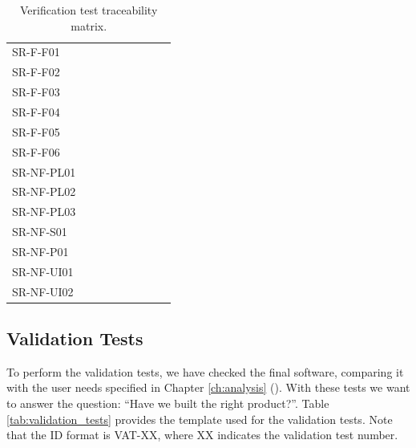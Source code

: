 \begin{table}[htb]
  \centering
  \begin{tabular}{@{}L{3cm}C{0.7cm}C{0.7cm}C{0.7cm}C{0.7cm}C{0.7cm}C{0.7cm}C{0.7cm}C{0.7cm}@{}}
    \toprule
      &  &  &  &  &  &  &  & \\
    \midrule
    SR-F-F01 & & & & & &  & &\\
    SR-F-F02 & & &  & & & & &\\
    SR-F-F03 & & & & & &  & &\\
    SR-F-F04 & & & &  & & & &\\
    SR-F-F05 & & & & &  & & &\\
    SR-F-F06 & &  & & & & & &\\
    SR-NF-PL01 &  & & & & & & & \\
    SR-NF-PL02 &  & & & & & & &\\
    SR-NF-PL03 &  & & & & & & &\\
    SR-NF-S01 & & & & & & &  &\\
    SR-NF-P01 & & & & & & & & \\
    SR-NF-UI01 & &  &  &  &  &  &  & \\
    SR-NF-UI02 &  &  &  &  &  &  &  & \\
    \bottomrule
\end{tabular}
\caption{Verification test traceability matrix.}
\label{tab:verification_matrix}
\end{table}    

\clearpage

\subsection{Validation Tests}

To perform the validation tests, we have checked the final software, comparing it with the user needs specified in Chapter \ref{ch:analysis} (\textit{}). With these tests we want to answer the question: ``Have we built the right product?''. Table \ref{tab:validation_tests} provides the template used for the validation tests. Note that the ID format is VAT-XX, where XX indicates the validation test number.

